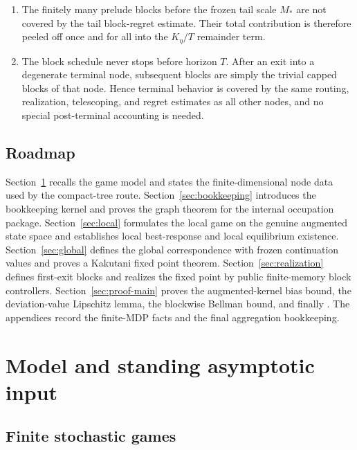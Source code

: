 \documentclass[12pt]{article}
\theoremstyle{definition}
\newcommand{\1}{\mathbf{1}}
\begin{document}
\begin{enumerate}[label=\textnormal{(\arabic*)},leftmargin=2.4em]
confined to $[0,d_\eta(C)]$ and boundary continuation values to
$[0,d_\eta(C)-1]^N$, where $d_\eta(C)$ is the remaining tree depth below $C$.
This is the correct box because each node contributes at most one unit of stage
payoff and continuation values propagate through only finitely many further
layers.
\item The finitely many prelude blocks before the frozen tail scale $M_*$ are not
covered by the tail block-regret estimate. Their total contribution is therefore
peeled off once and for all into the $K_\eta/T$ remainder term.
\item The block schedule never stops before horizon $T$. After an exit into a
degenerate terminal node, subsequent blocks are simply the trivial capped blocks
of that node. Hence terminal behavior is covered by the same routing,
realization, telescoping, and regret estimates as all other nodes, and no
special post-terminal accounting is needed.
\end{enumerate}

\subsection{Roadmap}


Section~\ref{sec:model} recalls the game model and states the finite-dimensional
node data used by the compact-tree route. Section~\ref{sec:bookkeeping}
introduces the bookkeeping kernel and proves the graph theorem for the internal
occupation package. Section~\ref{sec:local} formulates the local game on the
genuine augmented state space and establishes local best-response and local
equilibrium existence. Section~\ref{sec:global} defines the global correspondence
with frozen continuation values and proves a Kakutani fixed point theorem.
Section~\ref{sec:realization} defines first-exit blocks and realizes the fixed
point by public finite-memory block controllers. Section~\ref{sec:proof-main}
proves the augmented-kernel bias bound, the deviation-value Lipschitz lemma, the
blockwise Bellman bound, and finally . The appendices record the
finite-MDP facts and the final aggregation bookkeeping.

\section{Model and standing asymptotic input}
\label{sec:model}

\subsection{Finite stochastic games}
\end{document}
